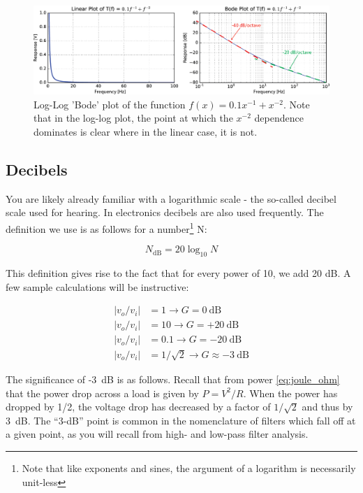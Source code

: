 \documentclass{tufte-book}
\begin{document}
\begin{figure}[h]
\caption{Log-Log 'Bode' plot of the function $f(x) = 0.1x^{-1}+x^{-2}$. Note that in the log-log plot, the point at which the $x^{-2}$ dependence dominates is clear where in the linear case, it is not.}
\label{ fig:BodePowers}
\begin{center}
\includegraphics[width=\textwidth]{BodePowers.png}
\end{center}
\end{figure}


\subsection{Decibels}
You are likely already familiar with a logarithmic scale - the so-called decibel scale used for hearing. In electronics decibels are also used frequently. The definition we use is as follows for a number\footnote{Note that like exponents and sines, the argument of a logarithm is necessarily unit-less} N:

$$
N_\text{dB} = 20\log_{10}N
$$

This definition gives rise to the fact that for every power of 10, we add 20 dB. A few sample calculations will be instructive:


\begin{align*}
|v_o/v_i| &= 1 \rightarrow G=0~\text{dB} \\
|v_o/v_i| &= 10  \rightarrow G=+20~\text{dB} \\
|v_o/v_i| &=0.1 \rightarrow G=-20~\text{dB}\\
|v_o/v_i| &= 1/\sqrt{2} \rightarrow G\approx -3~\text{dB}
\end{align*}

The significance of -3~dB is as follows. Recall that from power \ref{eq:joule_ohm} that the power drop across a load is given by $P = V^2/R$. When the power has dropped by 1/2, the voltage drop has decreased by a factor of $1/\sqrt{2}$ and thus by 3~dB. The ``3-dB'' point is common in the nomenclature of filters which fall off at a given point, as you will recall from high- and low-pass filter analysis.
\end{document}
